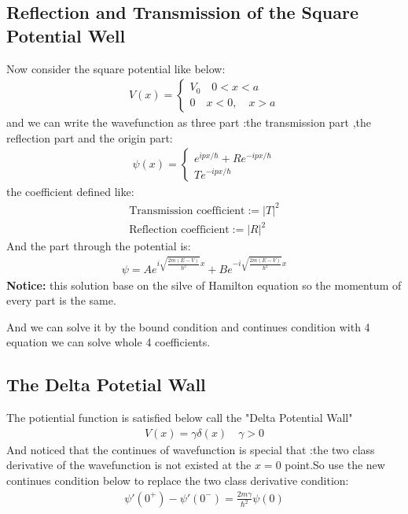 \documentclass{article}
\begin{document}
\subsection{Reflection and Transmission of the  Square Potential Well }
Now consider the square potential like below:
\begin{align}
  V(x)=\begin{cases}
V_0\quad0<x<a\\
0\quad x<0,\quad x>a
  \end{cases}
\end{align}
and we can write the wavefunction as three part :the transmission part ,the reflection part and the origin part:
\begin{align}
  \psi(x)=\begin{cases}
    e^{ipx/\hbar}+Re^{-ipx/\hbar}\\
    Te^{-ipx/\hbar}
  \end{cases}
\end{align}
the coefficient defined like:
\begin{align}
  \text{Transmission coefficient}:=|T|^2\\
  \text{Reflection coefficient}:=|R|^2
\end{align}
And the part through the potential is:
\begin{align}
  \psi=Ae^{i\sqrt{\frac{2m(E-V)}{\hbar^2}}x}+Be^{-i\sqrt{\frac{2m(E-V)}{\hbar^2}}x}
\end{align}
\textbf{Notice:} this solution base on the silve of Hamilton equation so the momentum of every part is the same.

And we can solve it by the bound condition and continues condition with 4 equation we can solve whole 4 coefficients.

\subsection{The Delta Potetial Wall}
The potiential function is satisfied below call the "Delta Potential Wall"
\begin{align}
V(x)=\gamma\delta(x)\quad\gamma>0
\end{align}
And noticed that the continues of wavefunction is special that :the two class derivative of the wavefunction is not existed at the $x=0$ point.So use the new continues condition below to replace the two class derivative condition:
\begin{align}
  \psi'(0^+)-\psi'(0^-)=\frac{2m\gamma}{\hbar^2}\psi(0)
\end{align}
\end{document}
